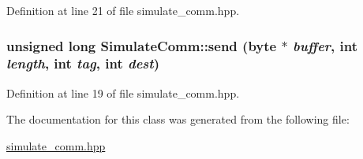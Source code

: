 Definition at line 21 of file simulate\_\-comm.hpp.\hypertarget{class_simulate_comm_a5bd343760bc13357ca5e7ef0f1d777e1}{
\subsubsection[{send}]{\setlength{\rightskip}{0pt plus 5cm}unsigned long SimulateComm::send ({\bf byte} $\ast$ {\em buffer}, \/  int {\em length}, \/  int {\em tag}, \/  int {\em dest})}}
\label{class_simulate_comm_a5bd343760bc13357ca5e7ef0f1d777e1}


Definition at line 19 of file simulate\_\-comm.hpp.

The documentation for this class was generated from the following file:\begin{DoxyCompactItemize}
\item 
\hyperlink{simulate__comm_8hpp}{simulate\_\-comm.hpp}\end{DoxyCompactItemize}
